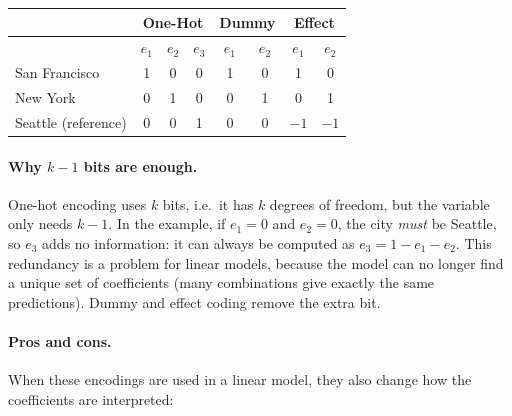 \begin{center}
    \small
    \renewcommand{\arraystretch}{1.3}
    \begin{tabular}{|l|c|c|c||c|c||c|c|}
    \hline
     & \multicolumn{3}{c||}{\textbf{One-Hot}} & \multicolumn{2}{c||}{\textbf{Dummy}} & \multicolumn{2}{c|}{\textbf{Effect}} \\
    \hline
     & $e_1$ & $e_2$ & $e_3$ & $e_1$ & $e_2$ & $e_1$ & $e_2$ \\
    \hline
    San Francisco & 1 & 0 & 0 & 1 & 0 & 1 & 0 \\
    \hline
    New York & 0 & 1 & 0 & 0 & 1 & 0 & 1 \\
    \hline
    Seattle (reference) & 0 & 0 & 1 & 0 & 0 & $-1$ & $-1$ \\
    \hline
    \end{tabular}
\end{center}

\paragraph{Why $k-1$ bits are enough.} One-hot encoding uses $k$ bits, i.e.\ it has $k$ degrees of freedom, but the variable only needs $k-1$. In the example, if $e_1=0$ and $e_2=0$, the city \emph{must} be Seattle, so $e_3$ adds no information: it can always be computed as $e_3 = 1-e_1-e_2$. This redundancy is a problem for linear models, because the model can no longer find a unique set of coefficients (many combinations give exactly the same predictions). Dummy and effect coding remove the extra bit.

\paragraph{Pros and cons.} When these encodings are used in a linear model, they also change how the coefficients are interpreted:

